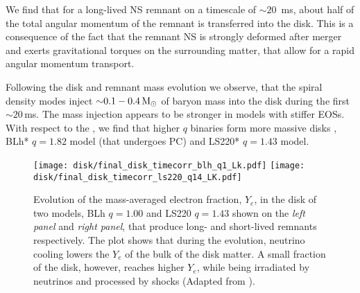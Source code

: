 We find that for a long-lived \ac{NS} remnant on a timescale of ${\sim}20$~ms, 
about half of the total angular momentum of the remnant is transferred 
into the disk. 
This is a consequence of the fact that the remnant \ac{NS} is strongly deformed 
after merger and exerts gravitational torques on the surrounding matter, 
that allow for a rapid angular momentum transport.

Following the disk and remnant mass evolution we observe, that the spiral 
density modes inject ${\sim}0.1-0.4\,{\text{M}_{\odot}}$ of baryon mass into the disk during the 
first ${\sim}20\,$ms. 
The mass injection appears to be stronger in models with stiffer \acp{EOS}. 
With respect to the \mr{}, we find that higher $q$ binaries form more massive disks 
\eg, BLh* $q=1.82$ model (that undergoes \ac{PC}) and 
LS220* $q=1.43$ model. 
%

\begin{figure}[t]
    \centering 
    \texttt{[image: disk/final\_disk\_timecorr\_blh\_q1\_Lk.pdf]}
    \texttt{[image: disk/final\_disk\_timecorr\_ls220\_q14\_LK.pdf]}
    \caption{
        Evolution of the mass-averaged electron fraction, $Y_e$, in 
        the disk of two models, BLh $q=1.00$ and LS220 $q=1.43$ shown on the 
        \textit{left panel} and \textit{right panel}, that produce 
        long- and short-lived remnants respectively.
        The plot shows that during the \pmerg{} evolution, neutrino 
        cooling lowers the $Y_e$ of the bulk of the disk matter. 
        A small fraction of the disk, however, reaches higher $Y_e$, 
        while being irradiated by neutrinos and processed by shocks 
        (Adapted from \citet{Nedora:2020pak}).
    }
    \label{fig:total_disk_time_corr_Ye_Blh_q1}
\end{figure}

